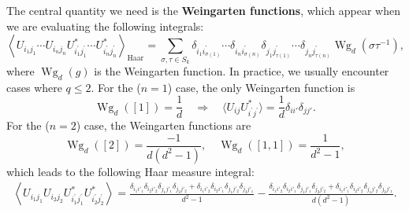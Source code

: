 \documentclass[aps,prb,superscriptaddress,nofootinbib]{revtex4}
\begin{document}
The central quantity we need is the \textbf{Weingarten functions}, which appear when we are evaluating the following integrals:
\begin{equation}\label{eq:haar-integral}
	\left\langle U_{i_1 j_1} \cdots U_{i_n j_n} U_{i_1^{\prime} j_1^{\prime}}^* \cdots U_{i_n^{\prime} j_n^{\prime}}^* \right\rangle_\text{Haar}
	= \sum_{\sigma, \tau \in S_k} \delta_{i_1 i_{\sigma(1)}^{\prime}} \cdots \delta_{i_n i_{\sigma(n)}^{\prime}} \delta_{j_1 j_{\tau(1)}^{\prime}} \cdots \delta_{j_n j_{\tau(n)}^{\prime}} \operatorname{Wg}_d\left(\sigma \tau^{-1}\right),
\end{equation}
where $\operatorname{Wg}_d(g)$ is the Weingarten function.
In practice, we usually encounter cases where $q\le 2$.
For the ($n=1$) case, the only Weingarten function is
\begin{equation}
	\operatorname{Wg}_d([1]) = \frac{1}{d} \quad\Longrightarrow\quad
	\langle U_{i j} U_{i^{\prime} j^{\prime}}^* \rangle = \frac{1}{d}\delta_{ii'}\delta_{jj'}.
\end{equation}
For the ($n=2$) case, the Weingarten functions are
\begin{equation}
	\operatorname{Wg}_d([2])=\frac{-1}{d\left(d^2-1\right)}, \quad
	\operatorname{Wg}_d\left([1,1]\right)=\frac{1}{d^2-1},
\end{equation}
which leads to the following Haar measure integral:
\begin{equation}
\begin{aligned}
	\left\langle U_{i_1 j_1} U_{i_2 j_2} U_{i_1^{\prime} j_1^{\prime}}^* U_{i_2^{\prime} j_2^{\prime}}^* \right\rangle 
	= \frac{
		\delta_{i_1 i'_1}\delta_{i_2 i'_2}\delta_{j_1 j'_1}\delta_{j_2 j'_2} + 
		\delta_{i_1 i'_2}\delta_{i_2 i'_1}\delta_{j_1 j'_2}\delta_{j_2 j'_1}
	}{d^2-1} 
	-\frac{
		\delta_{i_1 i'_2}\delta_{i_2 i'_1}\delta_{j_1 j'_1}\delta_{j_2 j'_2} + 
		\delta_{i_1 i'_1}\delta_{i_2 i'_2}\delta_{j_1 j'_2}\delta_{j_2 j'_1}
	}{d(d^2-1)}.
\end{aligned}
\end{equation} 
\end{document}

